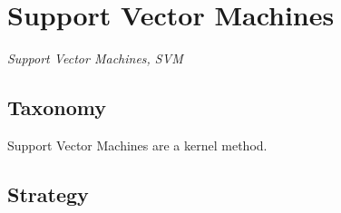 
\section{Support Vector Machines} 
\label{sec:svm}

\emph{Support Vector Machines, SVM}

\subsection{Taxonomy}
Support Vector Machines are a kernel method.

\subsection{Strategy}

